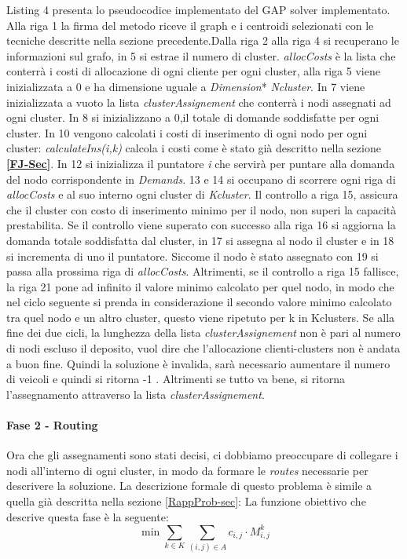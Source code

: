 \documentclass[]{article}
\begin{document}
Listing 4 presenta lo pseudocodice implementato del GAP solver implementato. Alla riga 1 la firma del metodo riceve il graph e i centroidi selezionati con le tecniche descritte nella sezione precedente.Dalla riga 2 alla riga 4 si recuperano le informazioni sul grafo, in 5 si estrae il numero di cluster. \textit{allocCosts} è la lista che conterrà i costi di allocazione di ogni cliente per ogni cluster, alla riga 5 viene inizializzata a 0 e ha dimensione uguale a \textit{Dimension}* \textit{Ncluster}. In 7 viene inizializzata a vuoto la lista \textit{clusterAssignement} che conterrà i nodi assegnati ad ogni cluster. In 8 si inizializzano a 0,il totale di domande soddisfatte per ogni cluster. In 10 vengono calcolati i costi di inserimento di ogni nodo per ogni cluster: \textit{calculateIns(i,k)} calcola i costi come è stato già descritto nella sezione \textbf{\ref{FJ-Sec}}. In 12 si inizializza il puntatore \emph{i} che servirà per puntare alla domanda del nodo corrispondente in \textit{Demands}. 13 e 14 si occupano di scorrere ogni riga di \textit{allocCosts} e al suo interno ogni cluster di \textit{Kcluster}. Il controllo a riga 15, assicura che il cluster con costo di inserimento minimo per il nodo, non superi la capacità prestabilita. Se il controllo viene superato con successo alla riga 16 si aggiorna la domanda totale soddisfatta dal cluster, in 17 si assegna al nodo il cluster e in 18 si incrementa di uno il puntatore. Siccome il nodo è stato assegnato con 19 si passa alla prossima riga di \textit{allocCosts}. Altrimenti, se il controllo a riga 15 fallisce, la riga 21 pone ad infinito il valore minimo calcolato per quel nodo, in modo che nel ciclo seguente si prenda in considerazione il secondo valore minimo calcolato tra quel nodo e un altro cluster, questo viene ripetuto per k in Kclusters.
Se alla fine dei due cicli, la lunghezza della lista \textit{clusterAssignement} non è pari al numero di nodi escluso il deposito, vuol dire che l'allocazione clienti-clusters non è andata a buon fine. Quindi la soluzione è invalida, sarà necessario aumentare il numero di veicoli e quindi si ritorna -1 . Altrimenti se tutto va bene, si ritorna l'assegnamento attraverso la lista \textit{clusterAssignement}. 

\newpage

\paragraph{Fase 2 - Routing } \hfill

Ora che gli assegnamenti sono stati decisi, ci dobbiamo preoccupare di collegare i nodi all'interno di ogni cluster, in modo da formare le \emph{routes} necessarie per descrivere la soluzione. La descrizione formale di questo problema è simile a quella già descritta nella sezione  \ref{RappProb-sec}: La funzione obiettivo che descrive questa fase è la seguente:
\begin{equation} \label{objF2}
\min \sum_{k \in K} \sum_{(i,j) \in A} c_{i,j} \cdot M_{i,j}^k 
\end{equation}
\end{document}
